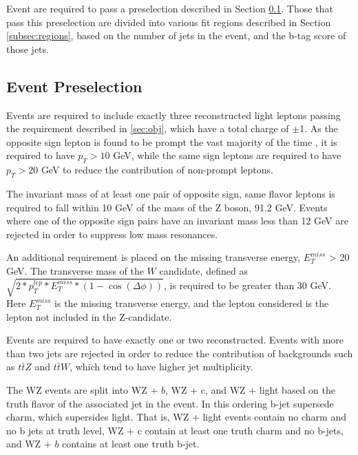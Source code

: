 
Event are required to pass a preselection described in Section \ref{subsec:presel}. Those that pass this preselection are divided into various fit regions described in Section \ref{subsec:regions}, based on the number of jets in the event, and the b-tag score of those jets.

\subsection{Event Preselection}
\label{subsec:presel}

Events are required to include exactly three reconstructed light leptons passing the requirement described in \ref{sec:obj}, which have a total charge of $\pm$1. As the opposite sign lepton is found to be prompt the vast majority of the time \cite{ttH_comb}, it is required to have $p_T > 10$ GeV, while the same sign leptons are required to have $p_T > 20$ GeV to reduce the contribution of non-prompt leptons.

The invariant mass of at least one pair of opposite sign, same flavor leptons is required to fall within 10 GeV of the mass of the Z boson, 91.2 GeV. Events where one of the opposite sign pairs have an invariant mass less than 12 GeV are rejected in order to suppress low mass resonances. %

An additional requirement is placed on the missing transverse energy, $E^{miss}_T$ > 20 GeV. The transverse mass of the $W$ candidate, defined as $\sqrt{2*p_T^{lep}*E^{miss}_T*(1-\cos(\Delta\phi))}$, is required to be greater than 30 GeV. Here $E^{miss}_T$ is the missing transverse energy, and the lepton considered is the lepton not included in the Z-candidate. 

Events are required to have exactly one or two reconstructed. Events with more than two jets are rejected in order to reduce the contribution of backgrounds such as $t\bar{t}Z$ and $t\bar{t}W$, which tend to have higher jet multiplicity. 

The WZ events are split into WZ + $b$, WZ + c, and WZ + light based on the truth flavor of the associated jet in the event. In this ordering b-jet supersede charm, which supersides light. That is, WZ + light events contain no charm and no b jets at truth level, WZ + c contain at least one truth charm and no b-jets, and WZ + $b$ contains at least one truth b-jet. 

